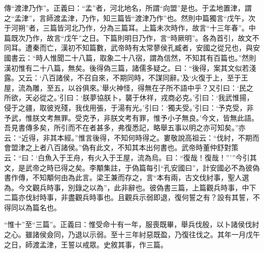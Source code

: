 {\noindent\zhuan{}\fzbyks 傳“渡津乃作”。正義曰：“孟”者，河北地名，所謂“向盟”是也。于孟地置津，謂之“孟津”，言師渡孟津，乃作，知三篇皆“渡津乃作”也。然則中篇獨言“戊午，次于河朔”者，三篇皆河北乃作，分為三篇耳。上篇未次時作，故言“十三年春”。中篇既次乃作，故言“戊午”之日。下篇則明日乃作，言“時厥明”。各為首引，故文不同耳。遭秦而亡，漢初不知篇數，武帝時有太常蓼侯孔臧者，安國之從兄也，與安國書云：“時人惟聞二十八篇，取象二十八宿，謂為信然，不知其有百篇也。”然則漢初惟有二十八篇，無矣。後得偽三篇，諸儒多疑之。曰：“後得，案其文似若淺露。又云：‘八百諸侯，不召自來，不期同時，不謀同辭。’及‘火復于上，至于王屋，流為雕，至五，以谷俱來。’舉火神怪，得無在子所不語中乎？又引曰：‘民之所欲，天必從之。’引曰：‘朕夢協朕卜，襲于休祥，戎商必克。’引曰：‘我武惟揚，侵于之疆，取彼兇殘，我伐用張，于湯有光。’引曰：‘獨夫受。’引曰：‘予克受，非予武，惟朕文考無罪。受克予，非朕文考有罪，惟予小子無良。’今文，皆無此語。吾見書傳多矣，所引而不在者甚多，弗復悉記，略舉五事以明之亦可知矣。”亦云：“近得，非其本經。”惟言後得，不知何時得之。婁敬說高祖云：“伐紂，不期而會盟津之上者八百諸侯。”偽有此文，不知其本出何書也。武帝時董仲舒對策云：“曰：‘白魚入于王舟，有火入于王屋，流為烏。曰：“復哉！復哉！”’”今引其文，是武帝之時已得之矣。李顒集註，于偽篇每引“孔安國曰”，計安國必不為彼偽書作傳，不知顒何由為此言。梁王兼而存之，言“本有兩，古文伐紂事，聖人選為。今文觀兵時事，別錄之以為”，此非辭也。彼偽書三篇，上篇觀兵時事，中下二篇亦伐紂時事，非盡觀兵時事也。且觀兵示弱即退，復何誓之有？設有其誓，不得同以為篇名也。 \par}

{\noindent\shu{}\fzkt “惟十”至“三篇”。正義曰：惟受命十有一年，服喪既畢，舉兵伐殷，以卜諸侯伐紂之心。雖諸侯僉同，乃退以示弱。至十三年紂惡既盈，乃復往伐之。其年一月戊午之日，師渡孟津，王誓以戒眾。史敘其事，作三篇。 \par}

